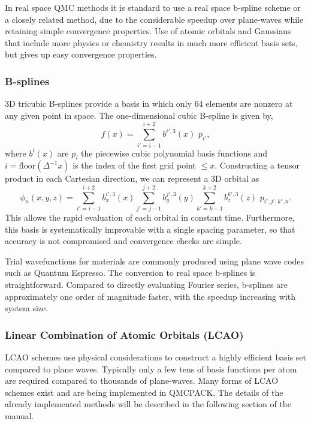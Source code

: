 In real space QMC methods it is standard to use a real space b-spline scheme or a closely related method, due to the considerable speedup over plane-waves while retaining simple convergence properties. Use of atomic orbitals and Gaussians that include more physics or chemistry results in much more efficient basis sets, but gives up easy convergence properties. 

\subsubsection{B-splines}
  3D tricubic B-splines provide a basis in which only
64 elements are nonzero at any given point in space.
The one-dimensional cubic B-spline is given by,
\begin{equation}
f(x) = \sum_{i'=i-1}^{i+2} b^{i'\!,3}(x)\,\,  p_{i'},
\label{eq:SplineFunc}
\end{equation}
where $b^{i}(x)$ are $p_i$ the piecewise cubic polynomial basis functions
and $i = \text{floor}(\Delta^{-1} x)$ is the index of
the first grid point $\le x$.  Constructing a tensor product in each Cartesian
direction, we can represent a 3D orbital as
\begin{equation}
  \phi_n(x,y,z) =
  \!\!\!\!\sum_{i'=i-1}^{i+2} \!\! b_x^{i'\!,3}(x)
  \!\!\!\!\sum_{j'=j-1}^{j+2} \!\! b_y^{j'\!,3}(y)
  \!\!\!\!\sum_{k'=k-1}^{k+2} \!\! b_z^{k'\!,3}(z) \,\, p_{i', j', k',n}.
\label{eq:TricubicValue}
\end{equation}
This allows the rapid evaluation of each orbital in constant time.
Furthermore, this basis is systematically improvable with a single spacing
parameter, so that accuracy is not compromised and convergence checks are simple.

Trial wavefunctions for materials are commonly produced using plane wave codes such as Quantum Espresso. The conversion to real space b-splines is straightforward. Compared to directly evaluating Fourier series, b-splines are approximately one order of magnitude faster, with the speedup increasing with system size.

\subsubsection{Linear Combination of Atomic Orbitals (LCAO)}
LCAO schemes use physical considerations to construct a highly efficient basis set compared to plane waves. Typically only a few tens of basis functions per atom are required compared to thousands of plane-waves. Many forms of LCAO schemes exist and are being implemented in QMCPACK. The details of the already implemented methods will be described in the following section of the manual. 

